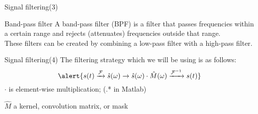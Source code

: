 \documentclass[10pt,aspectratio=169,notes]{beamer} %
\begin{document}
\begin{frame}{Signal filtering(3)}
\begin{alertblock}{Band-pass filter}
A band-pass filter (BPF) is a filter that passes frequencies within a certain range and rejects (attenuates) frequencies outside that range.\\
These filters can be created by combining a low-pass filter with a high-pass filter.
\end{alertblock}	
\end{frame}
\begin{frame}{Signal filtering(4)}
The filtering strategy which we will be using is as follows:
\begin{equation*}
\alert{s(t) \xrightarrow{\mathcal{F}} \hat{s}(\omega) \rightarrow \hat{s}(\omega) \cdot \hat{M}(\omega)  \xrightarrow{\mathcal{F}^{-1}}  s(t)}
\end{equation*}
\(\cdot\) is element-wise multiplication; (.* in Matlab)	

\(\hat{M}\) a kernel, convolution matrix, or mask
\end{frame}
\note{}
\end{document}
